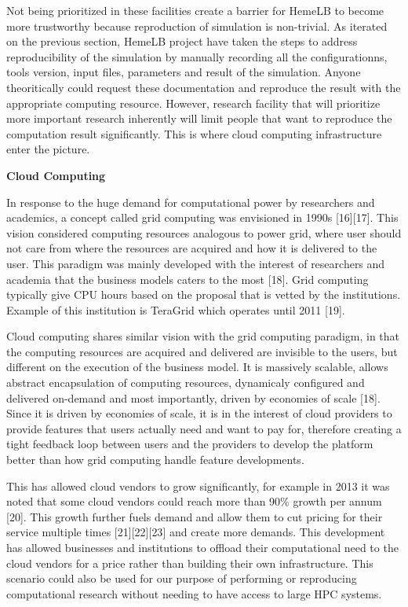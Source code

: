 \documentclass[]{article}
\begin{document}
Not being prioritized in these facilities create a barrier for HemeLB to
become more trustworthy because reproduction of simulation is
non-trivial. As iterated on the previous section, HemeLB project have
taken the steps to address reproducibility of the simulation by manually
recording all the configurationns, tools version, input files,
parameters and result of the simulation. Anyone theoritically could
request these documentation and reproduce the result with the
appropriate computing resource. However, research facility that will
prioritize more important research inherently will limit people that
want to reproduce the computation result significantly. This is where
cloud computing infrastructure enter the picture.

\textbf{Cloud Computing}

In response to the huge demand for computational power by researchers
and academics, a concept called grid computing was envisioned in 1990s
{[}16{]}{[}17{]}. This vision considered computing resources analogous
to power grid, where user should not care from where the resources are
acquired and how it is delivered to the user. This paradigm was mainly
developed with the interest of researchers and academia that the
business models caters to the most {[}18{]}. Grid computing typically
give CPU hours based on the proposal that is vetted by the institutions.
Example of this institution is TeraGrid which operates until 2011
{[}19{]}.

Cloud computing shares similar vision with the grid computing paradigm,
in that the computing resources are acquired and delivered are invisible
to the users, but different on the execution of the business model. It
is massively scalable, allows abstract encapsulation of computing
resources, dynamicaly configured and delivered on-demand and most
importantly, driven by economies of scale {[}18{]}. Since it is driven
by economies of scale, it is in the interest of cloud providers to
provide features that users actually need and want to pay for, therefore
creating a tight feedback loop between users and the providers to
develop the platform better than how grid computing handle feature
developments.

This has allowed cloud vendors to grow significantly, for example in
2013 it was noted that some cloud vendors could reach more than 90\%
growth per annum {[}20{]}. This growth further fuels demand and allow
them to cut pricing for their service multiple times
{[}21{]}{[}22{]}{[}23{]} and create more demands. This development has
allowed businesses and institutions to offload their computational need
to the cloud vendors for a price rather than building their own
infrastructure. This scenario could also be used for our purpose of
performing or reproducing computational research without needing to have
access to large HPC systems.
\end{document}
